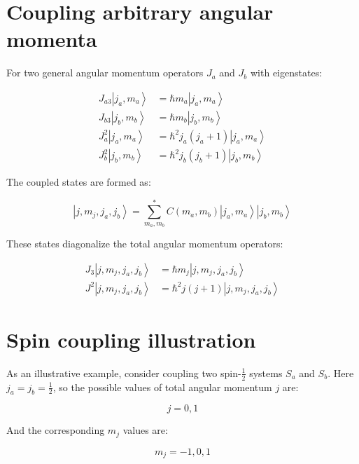 \section{Coupling arbitrary angular momenta}
For two general angular momentum operators $J_{a}$ and $J_{b}$ with eigenstates:

\begin{align}
J_{a3}\left|j_{a}, m_{a}\right\rangle &= \hbar m_{a}\left|j_{a}, m_{a}\right\rangle \\
J_{b3}\left|j_{b}, m_{b}\right\rangle &= \hbar m_{b}\left|j_{b}, m_{b}\right\rangle \\
J_{a}^{2}\left|j_{a}, m_{a}\right\rangle &= \hbar^2 j_{a}\left(j_{a}+1\right)\left|j_{a}, m_{a}\right\rangle  \\
J_{b}^{2}\left|j_{b}, m_{b}\right\rangle &= \hbar^{2} j_{b}\left(j_{b}+1\right)\left|j_{b}, m_{b}\right\rangle
\end{align}

The coupled states are formed as:

\begin{equation}
\left|j, m_{j}, j_{a}, j_{b}\right\rangle=\sum_{m_{a}, m_{b}}^{*} C\left(m_{a}, m_{b}\right)\left|j_{a}, m_{a}\right\rangle\left|j_{b}, m_{b}\right\rangle
\end{equation}

These states diagonalize the total angular momentum operators:

\begin{align}
J_{3}\left|j, m_{j}, j_{a}, j_{b}\right\rangle &= \hbar m_{j}\left|j, m_{j}, j_{a}, j_{b}\right\rangle \\
J^{2}\left|j, m_{j}, j_{a}, j_{b}\right\rangle &= \hbar^2 j(j+1)\left|j, m_{j}, j_{a}, j_{b}\right\rangle
\end{align}

\section{Spin coupling illustration}
As an illustrative example, consider coupling two spin-$\frac{1}{2}$ systems $S_{a}$ and $S_{b}$. Here $j_{a}=j_{b}=\frac{1}{2}$, so the possible values of total angular momentum $j$ are:

\begin{equation}
j=0,1
\end{equation}

And the corresponding $m_j$ values are:

\begin{equation}
m_{j}=-1,0,1
\end{equation}


